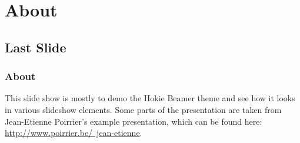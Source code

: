 \documentclass{beamer}
\begin{document}
\section{About}
\subsection{Last Slide}

\frame
{
	\frametitle{About}

	This slide show is mostly to demo the Hokie Beamer theme and see how it looks in various slideshow elements.  Some parts of the presentation are taken from Jean-Etienne Poirrier's example presentation, which can be found here:  \href{http://www.poirrier.be/~jean-etienne}{http://www.poirrier.be/~jean-etienne}.
}
\end{document}
